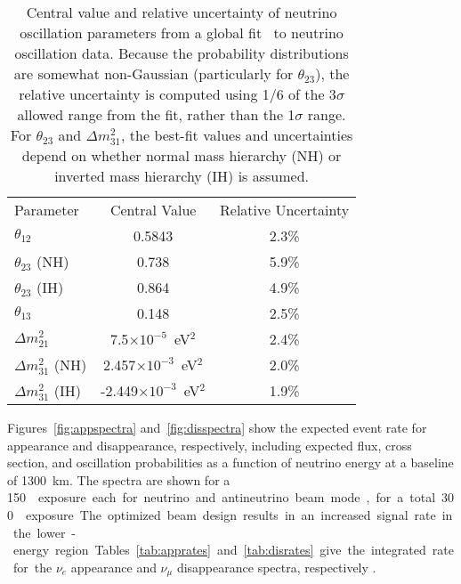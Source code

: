 \begin{table}[]
    \centering
    \begin{tabular}{lcc}
 Parameter &    Central Value & Relative Uncertainty \\
\toprowrule
$\theta_{12}$ & 0.5843 & 2.3\% \\ \colhline
$\theta_{23}$ (NH) & 0.738  & 5.9\% \\ \colhline
$\theta_{23}$ (IH) & 0.864  & 4.9\% \\ \colhline
$\theta_{13}$ & 0.148  & 2.5\% \\ \colhline
$\Delta m^2_{21}$ & 7.5$\times10^{-5}$~eV$^2$ & 2.4\% \\ \colhline
$\Delta m^2_{31}$ (NH) & 2.457$\times10^{-3}$~eV$^2$ &  2.0\% \\ \colhline
$\Delta m^2_{31}$ (IH) & -2.449$\times10^{-3}$~eV$^2$ &  1.9\% \\
    \end{tabular}
    \caption{Central value and relative uncertainty of neutrino oscillation parameters from a global fit~\cite{Gonzalez-Garcia:2014bfa} to neutrino oscillation data. Because the probability distributions are somewhat non-Gaussian (particularly for $\theta_{23}$), the relative uncertainty is computed using 1/6 of the 3$\sigma$ allowed range from the fit, rather than the 1$\sigma$ range.   For $\theta_{23}$ and $\Delta m^2_{31}$, the best-fit values and uncertainties depend on whether normal mass hierarchy (NH) or inverted mass hierarchy (IH) is assumed.}
    \label{tab:oscpar_nufit}
\end{table}

Figures~\ref{fig:appspectra} and~\ref{fig:disspectra} show the expected event rate for \nue appearance and \numu disappearance, respectively, including expected flux, cross section, and oscillation probabilities as a function of neutrino energy at a baseline of
\num{1300}~km. The spectra are shown for a \SI{150}~\ktMWyr{} exposure each for neutrino and antineutrino beam mode, for a total \SI{300}~\ktMWyr{} exposure.  The optimized beam design results in an increased signal rate in the lower-energy region. Tables~\ref{tab:apprates} and~\ref{tab:disrates} give the integrated rate for the $\nu_e$ appearance and $\nu_\mu$ disappearance spectra, respectively .  

